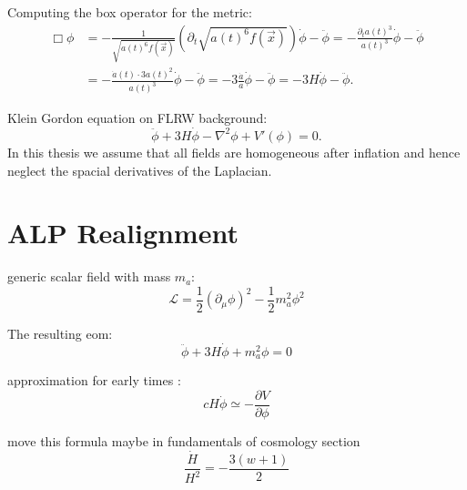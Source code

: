 \documentclass[master,       %
               twoside,        %
               BCOR10mm,       %
               english,ngerman, %
               ]{GAUBM}
\begin{document}
\begin{otherlanguage}{english}
Computing the box operator for the metric:
\begin{align}
	    \Box \phi 
	    &= - \frac{1}{\sqrt{a(t)^6 f(\vec{x})}} (\partial_t \sqrt{ a(t)^6 f(\vec{x}) }) \dot{\phi} - \ddot{\phi}
	    = - \frac{\partial_t a(t)^3}{a(t)^3} \dot{\phi} - \ddot{\phi} \nonumber \\
	    &= - \frac{\dot{a}(t) \cdot 3 a(t)^2}{a(t)^3} \dot{\phi} - \ddot{\phi}
	    = - 3 \frac{\dot{a}}{a} \dot{\phi} - \ddot{\phi}
	    = - 3H \dot{\phi} - \ddot{\phi}.
\end{align}

Klein Gordon equation on FLRW background:
\begin{equation}
	\ddot{\phi} + 3 H \dot{\phi} - \nabla^2 \phi + V'(\phi) = 0.
\end{equation}
In this thesis we assume that all fields are homogeneous after inflation and hence neglect the spacial derivatives of the Laplacian. 



\section{ALP Realignment}

generic scalar field with mass $m_a$:
\begin{equation}
	\mathcal{L} = \frac{1}{2} \left( \partial_\mu \phi \right)^2 - \frac{1}{2} m_a^2 \phi^2
	\label{eq:L_alp}
\end{equation}

The resulting eom:
\begin{equation}
	\ddot{\phi} + 3 H \dot{\phi} + m_a^2 \phi = 0 
\end{equation}

approximation for early times \cite[appendix A]{early_scalar_field_dynamics_PhysRevD.84.123506}:
\begin{equation}
	\label{eq:scalar_field_early_times_eom}
	c H \dot{\phi} \simeq - \frac{\partial V}{\partial \phi}
\end{equation}

move this formula maybe in fundamentals of cosmology section
\begin{equation}
	\frac{\dot{H}}{H^2} = - \frac{3(w + 1)}{2}
\end{equation}


\end{otherlanguage}
\end{document}

